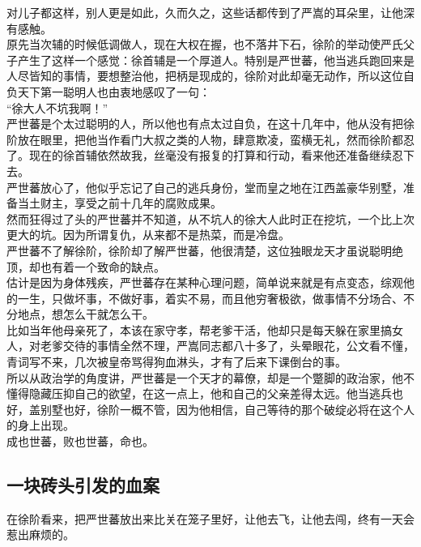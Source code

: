 \begin{multicols}{\theparacolNo}
对儿子都这样，别人更是如此，久而久之，这些话都传到了严嵩的耳朵里，让他深有感触。\\

原先当次辅的时候低调做人，现在大权在握，也不落井下石，徐阶的举动使严氏父子产生了这样一个感觉：徐首辅是一个厚道人。特别是严世蕃，他当逃兵跑回来是人尽皆知的事情，要想整治他，把柄是现成的，徐阶对此却毫无动作，所以这位自负天下第一聪明人也由衷地感叹了一句：\\

“徐大人不坑我啊！”\\

严世蕃是个太过聪明的人，所以他也有点太过自负，在这十几年中，他从没有把徐阶放在眼里，把他当作看门大叔之类的人物，肆意欺凌，蛮横无礼，然而徐阶都忍了。现在的徐首辅依然故我，丝毫没有报复的打算和行动，看来他还准备继续忍下去。\\

严世蕃放心了，他似乎忘记了自己的逃兵身份，堂而皇之地在江西盖豪华别墅，准备当土财主，享受之前十几年的腐败成果。\\

然而狂得过了头的严世蕃并不知道，从不坑人的徐大人此时正在挖坑，一个比上次更大的坑。因为所谓复仇，从来都不是热菜，而是冷盘。\\

严世蕃不了解徐阶，徐阶却了解严世蕃，他很清楚，这位独眼龙天才虽说聪明绝顶，却也有着一个致命的缺点。\\

估计是因为身体残疾，严世蕃存在某种心理问题，简单说来就是有点变态，综观他的一生，只做坏事，不做好事，着实不易，而且他穷奢极欲，做事情不分场合、不分地点，想怎么干就怎么干。\\

比如当年他母亲死了，本该在家守孝，帮老爹干活，他却只是每天躲在家里搞女人，对老爹交待的事情全然不理，严嵩同志都八十多了，头晕眼花，公文看不懂，青词写不来，几次被皇帝骂得狗血淋头，才有了后来下课倒台的事。\\

所以从政治学的角度讲，严世蕃是一个天才的幕僚，却是一个蹩脚的政治家，他不懂得隐藏压抑自己的欲望，在这一点上，他和自己的父亲差得太远。他当逃兵也好，盖别墅也好，徐阶一概不管，因为他相信，自己等待的那个破绽必将在这个人的身上出现。\\

成也世蕃，败也世蕃，命也。\\

\subsection{一块砖头引发的血案}
在徐阶看来，把严世蕃放出来比关在笼子里好，让他去飞，让他去闯，终有一天会惹出麻烦的。\\


\end{multicols}
